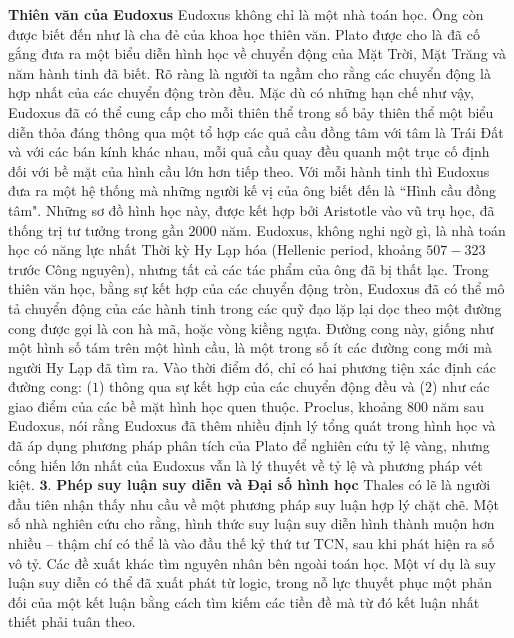 \begin{multicols}{2}
\begin{figure}[H]
		\vspace*{-15pt}
	\end{figure}
	\textbf{\color{lichsutoanhoc}Thiên văn của Eudoxus} 
	\vskip 0.1cm
	Eudoxus không chỉ là một nhà toán học. Ông còn được biết đến như là cha đẻ của khoa học thiên văn. Plato được cho là đã cố gắng đưa ra một biểu diễn hình học về chuyển động của Mặt Trời, Mặt Trăng và năm hành tinh đã biết. Rõ ràng là người ta ngầm cho rằng các chuyển động là hợp nhất của các chuyển động tròn đều. Mặc dù có những hạn chế như vậy, Eudoxus đã có thể cung cấp cho mỗi thiên thể trong số bảy thiên thể một biểu diễn thỏa đáng thông qua một tổ hợp các quả cầu đồng tâm với tâm là Trái Đất và với các bán kính khác nhau, mỗi quả cầu quay đều quanh một trục cố định đối với bề mặt của hình cầu lớn hơn tiếp theo. Với mỗi hành tinh thì Eudoxus đưa ra một hệ thống mà những người kế vị của ông biết đến là ``Hình cầu đồng tâm". Những sơ đồ hình học này, được kết hợp bởi Aristotle vào vũ trụ học, đã thống trị tư tưởng trong gần $2000$ năm.
	\vskip 0.1cm
	Eudoxus, không nghi ngờ gì, là nhà toán học có năng lực nhất Thời kỳ Hy Lạp hóa (Hellenic period, khoảng $507 - 323$ trước Công nguyên), nhưng tất cả các tác phẩm của ông đã bị thất lạc. Trong thiên văn học, bằng sự kết hợp của các chuyển động tròn, Eudoxus đã có thể mô tả chuyển động của các hành tinh trong các quỹ đạo lặp lại dọc theo một đường cong được gọi là con hà mã, hoặc vòng kiềng ngựa. Đường cong này, giống như một hình số tám trên một hình cầu, là một trong số ít các đường cong mới mà người Hy Lạp đã tìm ra. Vào thời điểm đó, chỉ có hai phương tiện xác định các đường cong: ($1$) thông qua sự kết hợp của các chuyển động đều và ($2$) như các giao điểm của các bề mặt hình học quen thuộc. 
	\vskip 0.1cm
	Proclus, khoảng $800$ năm sau Eudoxus, nói rằng Eudoxus đã thêm nhiều định lý tổng quát trong hình học và đã áp dụng phương pháp phân tích của Plato để nghiên cứu tỷ lệ vàng, nhưng cống hiến lớn nhất của  Eudoxus vẫn là lý thuyết về tỷ lệ và phương pháp vét kiệt.
	\vskip 0.1cm
	$\pmb{3.}$ \textbf{\color{lichsutoanhoc}Phép suy luận suy diễn và Đại số hình học}
	\vskip 0.1cm 
	Thales có lẽ là người đầu tiên nhận thấy nhu cầu về một phương pháp suy luận hợp lý chặt chẽ. Một số nhà nghiên cứu cho rằng, hình thức suy luận suy diễn hình thành muộn hơn nhiều -- thậm chí có thể là vào đầu thế kỷ thứ tư TCN, sau khi phát hiện ra số vô tỷ. 
	\vskip 0.1cm
	Các đề xuất khác tìm nguyên nhân bên ngoài toán học. Một ví dụ là suy luận suy diễn có thể đã xuất phát từ logic, trong nỗ lực thuyết phục một phản đối của một kết luận bằng cách tìm kiếm các tiền đề mà từ đó kết luận nhất thiết phải tuân theo.

\end{multicols}
